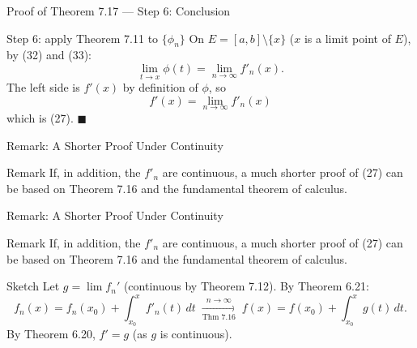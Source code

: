 \documentclass[aspectratio=169,12pt,t]{beamer}
\begin{document}
{\begin{frame}{Proof of Theorem 7.17 --- Step 6: Conclusion}
  \begin{proofblock}{Step 6: apply Theorem 7.11 to $\{\phi_n\}$}
    On $E = [a,b] \setminus \{x\}$ ($x$ is a limit point of $E$), by (32) and (33):
    \[
      \lim_{t \to x} \phi(t) = \lim_{n \to \infty} f'_n(x).
    \]
    The left side is $f'(x)$ by definition of $\phi$, so
    \[
      \boxed{\, f'(x) = \lim_{n \to \infty} f'_n(x) \,}
    \]
    which is (27). \hfill $\blacksquare$
  \end{proofblock}

\end{frame}

\begin{frame}{Remark: A Shorter Proof Under Continuity}
  \begin{remblock}{Remark}
    If, in addition, the $f'_n$ are \alert{continuous}, a much shorter proof of
    (27) can be based on Theorem 7.16 and the fundamental theorem of calculus.
  \end{remblock}

\end{frame}

\begin{frame}{Remark: A Shorter Proof Under Continuity}
  \begin{remblock}{Remark}
    If, in addition, the $f'_n$ are \alert{continuous}, a much shorter proof of
    (27) can be based on Theorem 7.16 and the fundamental theorem of calculus.
  \end{remblock}
  \begin{proofblock}{Sketch}
    Let $g = \lim f_n'$ (continuous by Theorem 7.12). By Theorem 6.21:
    \[
      f_n(x) = f_n(x_0) + \int_{x_0}^{x} f'_n(t)\,dt
      \;\xrightarrow[\text{Thm 7.16}]{n \to \infty}\;
      f(x) = f(x_0) + \int_{x_0}^{x} g(t)\,dt.
    \]
    By Theorem 6.20, $f' = g$ \; (as $g$ is continuous).
  \end{proofblock}


\end{frame}}
\end{document}
